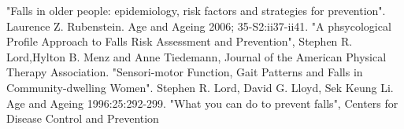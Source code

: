 \begin{thebibliography}{99}

"Falls in older people: epidemiology, risk factors and strategies for prevention". Laurence Z. Rubenstein. Age and Ageing 2006; 35-S2:ii37-ii41.
"A phsycological Profile Approach to Falls Risk Assessment and Prevention", Stephen R. Lord,Hylton B. Menz and Anne Tiedemann, Journal of the American Physical Therapy Association. 
"Sensori-motor Function, Gait Patterns and Falls in Community-dwelling Women". Stephen R. Lord, David G. Lloyd, Sek Keung Li. Age and Ageing 1996:25:292-299.
  "What you can do to prevent falls", Centers for Disease Control and Prevention
  
\end{thebibliography}